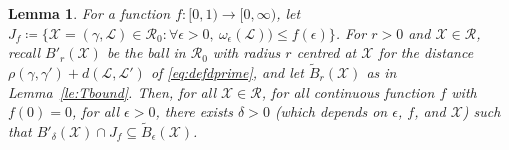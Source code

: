 \documentclass[11pt]{article}
\newtheorem{lemma}[theorem]{Lemma}
\def\Conf{{\mathscr{R}}}
\begin{document}
\begin{lemma}
\label{le:omegabound}
  For a function $f:[0,1)\to [0,\infty)$, let $J_f\coloneqq \{ \mathcal{X}=(\gamma,\mathcal{L})\in \Conf_0: \forall \epsilon>0,\ \omega_\epsilon(\mathcal{L}))\leq f(\epsilon)\}$.
  For $r>0$ and $\mathcal{X}\in\Conf$, recall $B'_{r}(\mathcal{X})$ be the ball in $\mathcal{R}_0$ with radius $r$ centred at $\mathcal{X}$ for the distance $\rho(\gamma,\gamma')+d( \mathcal{L},\mathcal{L}'  )$ of \eqref{eq:defdprime}, and let $\tilde{B}_r(\mathcal{X})$ as in Lemma~\ref{le:Tbound}.
  Then,  for all $\mathcal{X}\in\Conf$,
  for all continuous function $f$ with $f(0)=0$, for all $\epsilon>0$, there exists $\delta>0$ (which depends on $\epsilon$, $f$, and $\mathcal{X}$)
  such that $B'_{\delta}(\mathcal{X})\cap J_f\subseteq \tilde{B}_\epsilon(\mathcal{X})$.
\end{lemma}
\end{document}
